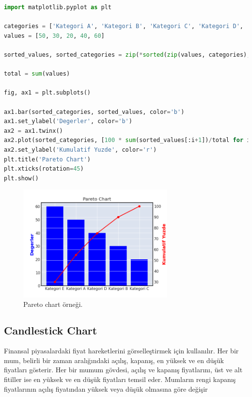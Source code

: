 \begin{lstlisting}[language=Python]
import matplotlib.pyplot as plt

categories = ['Kategori A', 'Kategori B', 'Kategori C', 'Kategori D', 'Kategori E']
values = [50, 30, 20, 40, 60]

sorted_values, sorted_categories = zip(*sorted(zip(values, categories), reverse=True))

total = sum(values)

fig, ax1 = plt.subplots()

ax1.bar(sorted_categories, sorted_values, color='b')
ax1.set_ylabel('Degerler', color='b')
ax2 = ax1.twinx()
ax2.plot(sorted_categories, [100 * sum(sorted_values[:i+1])/total for i in range(len(sorted_values))], color='r', marker='o')
ax2.set_ylabel('Kumulatif Yuzde', color='r')
plt.title('Pareto Chart')
plt.xticks(rotation=45)
plt.show()
\end{lstlisting}

\begin{figure}[h]
    \centering
    \includegraphics[width=0.7\textwidth]{images/pareto_chart.png}
    \caption{Pareto chart örneği.}
    \label{fig:enter-label}
\end{figure}

\newpage

\subsection{Candlestick Chart}
Finansal piyasalardaki fiyat hareketlerini görselleştirmek için kullanılır. Her bir mum, belirli bir zaman aralığındaki açılış, kapanış, en yüksek ve en düşük fiyatları gösterir. Her bir mumum gövdesi, açılış ve kapanış fiyatlarını, üst ve alt fitiller ise en yüksek ve en düşük fiyatları temsil eder. Mumların rengi kapanış fiyatlarının açılış fiyatından yüksek veya düşük olmasına göre değişir


